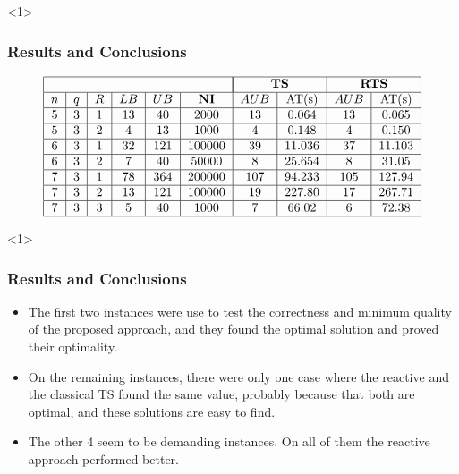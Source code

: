 \documentclass{beamer}
\begin{document}
\begin{frame}<1>
  \frametitle{Results and Conclusions}

\[
\begin{tabular}{|c|c|c|c|c|c|c|c|c|c|}
\hline
\multicolumn{6}{|c|}{} & \multicolumn{2}{|c|}{\textbf{TS} } & \multicolumn{2}{|c|}{\textbf{RTS}} \\ \hline
$n$ & $q$ & $R$ & $LB$  & $UB$ & \textbf{NI} & $AUB$ & AT(s) & $AUB$ & AT(s) \\  \hline
5 & 3 & 1 &  13  & 40 & 2000 & 13 & 0.064 & 13 & 0.065 \\ \hline
5 & 3 & 2 & 4 & 13 & 1000 & 4 & 0.148 & 4 & 0.150 \\  \hline
6 & 3 & 1 & 32  & 121 & 100000 & 39 & 11.036 & 37 & 11.103 \\ \hline
6 & 3 & 2 & 7  & 40 & 50000 & 8 & 25.654 & 8 & 31.05 \\  \hline
7 & 3 & 1 & 78 & 364 & 200000 & 107 & 94.233 & 105 & 127.94 \\  \hline
7 & 3 & 2  & 13 & 121 & 100000 & 19 & 227.80 & 17 & 267.71 \\ \hline
7 & 3 & 3 & 5 & 40 & 1000 & 7 & 66.02 & 6 & 72.38 \\ \hline
\end{tabular}
\]
\end{frame}


\begin{frame}<1>
  \frametitle{Results and Conclusions}

{ 
	
  \begin{itemize}
  	\item The first two instances were use to test the correctness and minimum quality of the proposed approach, and they found the optimal solution and proved their optimality.
  	
  	\item On the remaining instances, there were only one case where the reactive and the classical TS found the same
value, probably because that both are optimal, and these solutions are easy to find.
  	
  	\item The other 4 seem to be demanding instances. On all of them the reactive approach performed better.

  \end{itemize}

}
\end{frame}
\end{document}
